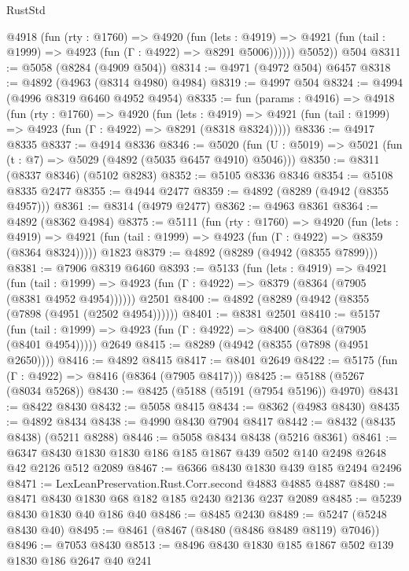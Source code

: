 \begin{lexlean}{RustStd}
\begin{coremodule}
          @4918
            (fun (rty : @1760) =>
            @4920
              (fun (lets : @4919) =>
              @4921 (fun (tail : @1999) => @4923 (fun (Γ : @4922) => @8291 @5006))))))
        @5052))
    @504
@8311 := @5058 (@8284 (@4909 @504))
@8314 := @4971 (@4972 @504) @6457
@8318 := @4892 (@4963 (@8314 @4980) @4984)
@8319 := @4997 @504
@8324 := @4994 (@4996 @8319 @6460 @4952 @4954)
@8335 := fun (params : @4916) =>
  @4918
    (fun (rty : @1760) =>
    @4920
      (fun (lets : @4919) =>
      @4921 (fun (tail : @1999) => @4923 (fun (Γ : @4922) => @8291 (@8318 @8324)))))
@8336 := @4917 @8335
@8337 := @4914 @8336
@8346 := @5020 (fun (U : @5019) => @5021 (fun (t : @7) => @5029 (@4892 (@5035 @6457 @4910) @5046)))
@8350 := @8311 (@8337 @8346) (@5102 @8283)
@8352 := @5105 @8336 @8346
@8354 := @5108 @8335 @2477
@8355 := @4944 @2477
@8359 := @4892 (@8289 (@4942 (@8355 @4957)))
@8361 := @8314 (@4979 @2477)
@8362 := @4963 @8361
@8364 := @4892 (@8362 @4984)
@8375 := @5111
    (fun (rty : @1760) =>
    @4920
      (fun (lets : @4919) =>
      @4921 (fun (tail : @1999) => @4923 (fun (Γ : @4922) => @8359 (@8364 @8324)))))
    @1823
@8379 := @4892 (@8289 (@4942 (@8355 @7899)))
@8381 := @7906 @8319 @6460
@8393 := @5133
    (fun (lets : @4919) =>
    @4921
      (fun (tail : @1999) => @4923 (fun (Γ : @4922) => @8379 (@8364 (@7905 (@8381 @4952 @4954))))))
    @2501
@8400 := @4892 (@8289 (@4942 (@8355 (@7898 (@4951 (@2502 @4954))))))
@8401 := @8381 @2501
@8410 := @5157
    (fun (tail : @1999) => @4923 (fun (Γ : @4922) => @8400 (@8364 (@7905 (@8401 @4954)))))
    @2649
@8415 := @8289 (@4942 (@8355 (@7898 (@4951 @2650))))
@8416 := @4892 @8415
@8417 := @8401 @2649
@8422 := @5175 (fun (Γ : @4922) => @8416 (@8364 (@7905 @8417)))
@8425 := @5188 (@5267 (@8034 @5268))
@8430 := @8425 (@5188 (@5191 (@7954 @5196)) @4970)
@8431 := @8422 @8430
@8432 := @5058 @8415
@8434 := @8362 (@4983 @8430)
@8435 := @4892 @8434
@8438 := @4990 @8430 @7904 @8417
@8442 := @8432 (@8435 @8438) (@5211 @8288)
@8446 := @5058 @8434 @8438 (@5216 @8361)
@8461 := @6347 @8430 @1830 @1830 @186 @185 @1867 @439 @502 @140 @2498 @2648 @42 @2126 @512 @2089
@8467 := @6366 @8430 @1830 @439 @185 @2494 @2496
@8471 := LexLeanPreservation.Rust.Corr.second @4883 @4885 @4887
@8480 := @8471 @8430 @1830 @68 @182 @185 @2430 @2136 @237 @2089
@8485 := @5239 @8430 @1830 @40 @186 @40
@8486 := @8485 @2430
@8489 := @5247 (@5248 @8430 @40)
@8495 := @8461 (@8467 (@8480 (@8486 @8489 @8119) @7046))
@8496 := @7053 @8430
@8513 := @8496
    @8430
    @1830
    @185
    @1867
    @502
    @139
    @1830
    @186
    @2647
    @40
    @241

\end{coremodule}
\end{lexlean}
